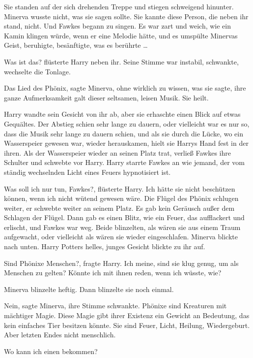 Sie standen auf der sich drehenden Treppe und stiegen schweigend hinunter.
Minerva wusste nicht, was sie sagen sollte. Sie kannte diese Person, die neben
ihr stand, nicht. Und Fawkes begann zu singen. Es war zart und weich, wie ein
Kamin klingen würde, wenn er eine Melodie hätte, und es umspülte Minervas Geist,
beruhigte, besänftigte, was es berührte …

\glqq Was ist das?\grqq{} flüsterte Harry neben ihr. Seine Stimme war instabil,
schwankte, wechselte die Tonlage.

\glqq Das Lied des Phönix\grqq{}, sagte Minerva, ohne wirklich zu wissen, was
sie sagte, ihre ganze Aufmerksamkeit galt dieser seltsamen, leisen Musik. \glqq
Sie heilt.\grqq{}

Harry wandte sein Gesicht von ihr ab, aber sie erhaschte einen Blick auf etwas
Gequältes. Der Abstieg schien sehr lange zu dauern, oder vielleicht war es nur
so, dass die Musik sehr lange zu dauern schien, und als sie durch die Lücke, wo
ein Wasserspeier gewesen war, wieder herauskamen, hielt sie Harrys Hand fest in
der ihren. Als der Wasserspeier wieder an seinen Platz trat, verließ Fawkes ihre
Schulter und schwebte vor Harry. Harry starrte Fawkes an wie jemand, der vom
ständig wechselnden Licht eines Feuers hypnotisiert ist.

\glqq Was soll ich nur tun, Fawkes?\grqq{}, flüsterte Harry. \glqq Ich hätte sie
nicht beschützen können, wenn ich nicht wütend gewesen wäre.\grqq{} Die Flügel
des Phönix schlugen weiter, er schwebte weiter an seinem Platz. Es gab kein
Geräusch außer dem Schlagen der Flügel. Dann gab es einen Blitz, wie ein Feuer,
das aufflackert und erlischt, und Fawkes war weg. Beide blinzelten, als wären
sie aus einem Traum aufgewacht, oder vielleicht als wären sie wieder
eingeschlafen. Minerva blickte nach unten. Harry Potters helles, junges Gesicht
blickte zu ihr auf.

\glqq Sind Phönixe Menschen?\grqq{}, fragte Harry. \glqq Ich meine, sind sie
klug genug, um als Menschen zu gelten? Könnte ich mit ihnen reden, wenn ich
wüsste, wie?\grqq{}

Minerva blinzelte heftig. Dann blinzelte sie noch einmal.

\glqq Nein\grqq{}, sagte Minerva, ihre Stimme schwankte. \glqq Phönixe sind
Kreaturen mit mächtiger Magie. Diese Magie gibt ihrer Existenz ein Gewicht an
Bedeutung, das kein einfaches Tier besitzen könnte. Sie sind Feuer, Licht,
Heilung, Wiedergeburt. Aber letzten Endes nicht menschlich.\grqq{}

\glqq Wo kann ich einen bekommen?\grqq{}

